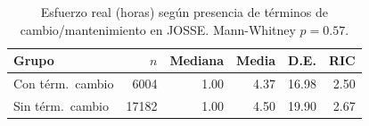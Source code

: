 \begin{table}[t]
\centering
\caption{Esfuerzo real (horas) seg\'un presencia de t\'erminos de cambio/mantenimiento en JOSSE. Mann-Whitney $p=0.57$.}
\label{tab:dispersion}
\scriptsize
\setlength{\tabcolsep}{3.5pt}
\begin{tabular}{lrrrrr}
\toprule
Grupo & $n$ & Mediana & Media & D.E. & RIC \\
\midrule
Con t\'erm.\ cambio & 6004 & 1.00 & 4.37 & 16.98 & 2.50 \\
Sin t\'erm.\ cambio & 17182 & 1.00 & 4.50 & 19.90 & 2.67 \\
\bottomrule
\end{tabular}
\end{table}
